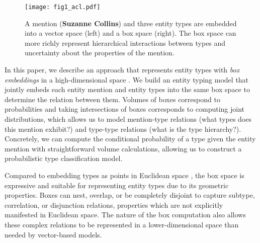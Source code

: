 \documentclass[11pt,a4paper]{article}
\begin{document}

\begin{figure*}[!t]
    \centering
    \texttt{[image: fig1\_acl.pdf]}
    \caption{A mention ({\bf Suzanne Collins}) and three entity types are embedded into a vector space (left) and a box space (right). The box space can more richly represent hierarchical interactions between types and uncertainty about the properties of the mention.}
    \label{fig:box_vs_vec}
    \vspace{-15pt}
\end{figure*}



In this paper, we describe an approach that represents entity types with \emph{box embeddings} in a high-dimensional space \cite{Luke_Vilnis_18}. We build an entity typing model that jointly embeds each entity mention and entity types into the same box space to determine the relation between them. Volumes of boxes correspond to probabilities and taking intersections of boxes corresponds to computing joint distributions, which allows us to model mention-type relations (what types does this mention exhibit?) and type-type relations (what is the type hierarchy?). Concretely, we can compute the conditional probability of a type given the entity mention with straightforward volume calculations, allowing us to construct a probabilistic type classification model.

Compared to embedding types as points in Euclidean space \cite{Xiang_Ren_16a}, the box space is expressive and suitable for representing entity types due to its geometric properties. Boxes can nest, overlap, or be completely disjoint to capture subtype, correlation, or disjunction relations, properties which are not explicitly manifested in Euclidean space. The nature of the box computation also allows these complex relations to be represented in a lower-dimensional space than needed by vector-based models.
\end{document}
